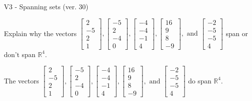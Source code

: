 \begin{exercise}
  \begin{exerciseTitle}V3 - Spanning sets (ver. 30)\end{exerciseTitle}
  \begin{exerciseStatement}
    Explain why the vectors \(\left[\begin{array}{r}
2 \\
-5 \\
2 \\
1
\end{array}\right] , \left[\begin{array}{r}
-5 \\
2 \\
-4 \\
0
\end{array}\right] , \left[\begin{array}{r}
-4 \\
-4 \\
-1 \\
4
\end{array}\right] , \left[\begin{array}{r}
16 \\
9 \\
8 \\
-9
\end{array}\right] , \text{ and } \left[\begin{array}{r}
-2 \\
-5 \\
-5 \\
4
\end{array}\right]\) span or don't span \(\mathbb{R}^4\). 
	


  \end{exerciseStatement}
  \begin{exerciseAnswer}
   The vectors \(\left[\begin{array}{r}
2 \\
-5 \\
2 \\
1
\end{array}\right] , \left[\begin{array}{r}
-5 \\
2 \\
-4 \\
0
\end{array}\right] , \left[\begin{array}{r}
-4 \\
-4 \\
-1 \\
4
\end{array}\right] , \left[\begin{array}{r}
16 \\
9 \\
8 \\
-9
\end{array}\right] , \text{ and } \left[\begin{array}{r}
-2 \\
-5 \\
-5 \\
4
\end{array}\right]\) 
  	 do  
	span \(\mathbb{R}^4\).
  



\end{exerciseAnswer}
\end{exercise}
